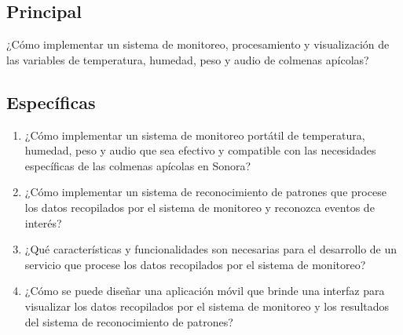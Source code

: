 
\subsection{Principal}
¿Cómo implementar un sistema de monitoreo, procesamiento y visualización de las variables de temperatura, humedad, peso y audio de colmenas apícolas?

\subsection{Específicas}
\begin{enumerate}
    \item ¿Cómo implementar un sistema de monitoreo portátil de temperatura, humedad, peso y audio que sea efectivo y compatible con las necesidades específicas de las colmenas apícolas en Sonora?
    \item ¿Cómo implementar un sistema de reconocimiento de patrones que procese los datos recopilados por el sistema de monitoreo y reconozca eventos de interés?
    \item ¿Qué características y funcionalidades son necesarias para el desarrollo de un servicio que procese los datos recopilados por el sistema de monitoreo?
    \item ¿Cómo se puede diseñar una aplicación móvil que brinde una interfaz para visualizar los datos recopilados por el sistema de monitoreo y los resultados del sistema de reconocimiento de patrones?
\end{enumerate}
